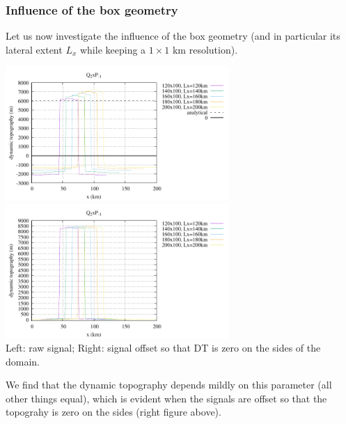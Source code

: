 \subsubsection*{Influence of the box geometry}

Let us now investigate the influence of the box geometry (and in particular its 
lateral extent $L_x$ while keeping a $1\times 1$ km resolution). 
\begin{center}
\includegraphics[width=8.5cm]{python_codes/fieldstone_160/results/dyn_topo5.pdf}
\includegraphics[width=8.5cm]{python_codes/fieldstone_160/results/dyn_topo5b.pdf}\\
{\captionfont Left: raw signal; Right: signal offset so that DT is zero on the 
sides of the domain.}
\end{center}
We find that the dynamic topography depends mildly on this parameter (all other
things equal), which is evident when the signals are offset so that the topograhy
is zero on the sides (right figure above).

